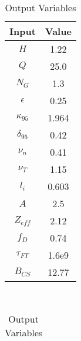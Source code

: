 \begin{table}[h!]
\centering  
\caption{Act II Variables}
\hfill
\begin{subtable}[t]{0.4\textwidth}
\centering  
\caption{Input Variables} ~\\
\begin{tabular}{ c|c } 

Input            & Value           \\
\hline
$H$              & 1.22            \\
$Q$              & 25.0            \\
$N_{G}$          & 1.3             \\
$\epsilon$       & 0.25            \\
$\kappa_{95}$    & 1.964           \\
$\delta_{95}$    & 0.42            \\
$\nu_{n}$        & 0.41            \\
$\nu_{T}$        & 1.15            \\
$l_{i}$          & 0.603         \\
$A$              & 2.5             \\
$Z_{eff}$        & 2.12            \\
$f_{D}$          & 0.74            \\
$\tau_{FT}$      & 1.6e9           \\
$B_{CS}$         & 12.77           \\

\end{tabular}
\end{subtable}
\hfill
\begin{subtable}[t]{0.5\textwidth}
\centering  
\caption{Output Variables} ~\\
\begin{tabular}{ c|c|c } 


\end{tabular}
\end{subtable}
\end{table}
